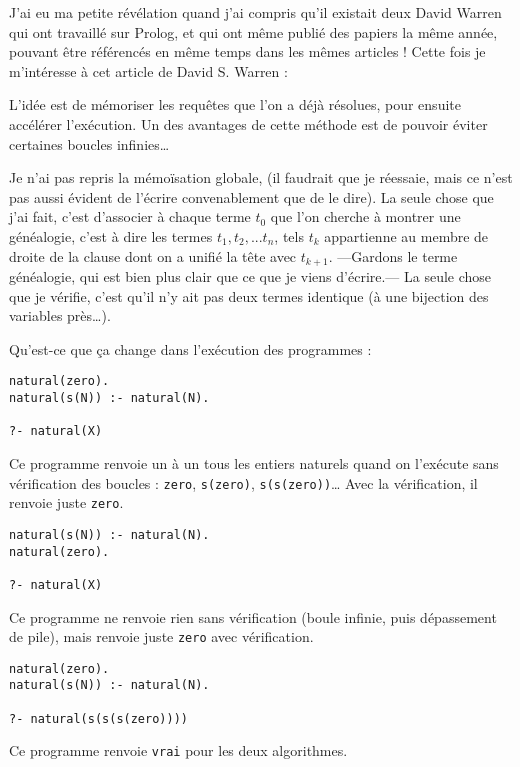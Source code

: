 \documentclass{article}
\begin{document}
J'ai eu ma petite révélation quand j'ai compris qu'il existait deux David Warren qui ont travaillé sur Prolog, et qui ont même publié des papiers la même année, pouvant être référencés en même temps dans les mêmes articles ! Cette fois je m'intéresse à cet article de David S. Warren : \cite{Warren}

L'idée est de mémoriser les requêtes que l'on a déjà résolues, pour ensuite accélérer l'exécution. Un des avantages de cette méthode est de pouvoir éviter certaines boucles infinies\ldots{}

Je n'ai pas repris la mémoïsation globale, (il faudrait que je réessaie, mais ce n'est pas aussi évident de l'écrire convenablement que de le dire). La seule chose que j'ai fait, c'est d'associer à chaque terme $t_0$ que l'on cherche à montrer une généalogie, c'est à dire les termes $t_1, t_2, ... t_n$, tels $t_k$ appartienne au membre de droite de la clause dont on a unifié la tête avec $t_{k+1}$. —Gardons le terme généalogie, qui est bien plus clair que ce que je viens d'écrire.— La seule chose que je vérifie, c'est qu'il n'y ait pas deux termes identique (à une bijection des variables près\ldots).

Qu'est-ce que ça change dans l'exécution des programmes :

\begin{verbatim}
natural(zero).
natural(s(N)) :- natural(N).

?- natural(X)
\end{verbatim}

Ce programme renvoie un à un tous les entiers naturels quand on l'exécute sans vérification des boucles : \texttt{zero}, \texttt{s(zero)}, \texttt{s(s(zero))}\ldots{} Avec la vérification, il renvoie juste \texttt{zero}.

\begin{verbatim}
natural(s(N)) :- natural(N).
natural(zero).

?- natural(X)
\end{verbatim}

Ce programme ne renvoie rien sans vérification (boule infinie, puis dépassement de pile), mais renvoie juste \texttt{zero} avec vérification.

\begin{verbatim}
natural(zero).
natural(s(N)) :- natural(N).

?- natural(s(s(s(zero))))
\end{verbatim}

Ce programme renvoie \texttt{vrai} pour les deux algorithmes.
\end{document}
